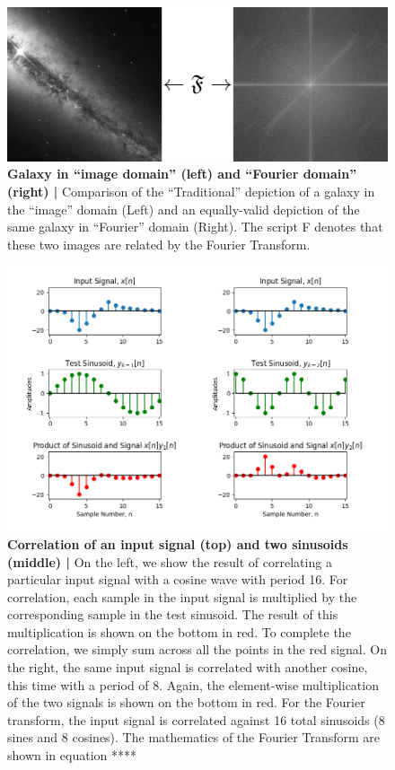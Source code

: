 \documentclass[12pt,a4paper]{article}
\author{Devin Cody}
\begin{document}
\begin{figure}
\centering
\includegraphics[width=\textwidth]{_images/FT.png}
\caption{\textbf{Galaxy in ``image domain'' (left) and ``Fourier domain'' (right) |} Comparison of the ``Traditional'' depiction of a galaxy in the ``image'' domain (Left) and an equally-valid depiction of the same galaxy in “Fourier” domain (Right). The script F denotes that these two images are related by the Fourier Transform.}
\end{figure}


\begin{figure}
\centering
\includegraphics[width=\textwidth]{_images/FourierCorrelation3-m56p3-47p1.png}
\caption{\textbf{Correlation of an input signal (top) and two sinusoids (middle) |} On the left, we show the result of correlating a particular input signal with a cosine wave with period 16. For correlation, each sample in the input signal is multiplied by the corresponding sample in the test sinusoid. The result of this multiplication is shown on the bottom in red. To complete the correlation, we simply sum across all the points in the red signal. On the right, the same input signal is correlated with another cosine, this time with a period of 8. Again, the element-wise multiplication of the two signals is shown on the bottom in red. For the Fourier transform, the input signal is correlated against 16 total sinusoids (8 sines and 8 cosines). The mathematics of the Fourier Transform are shown in equation ****}
\end{figure}
\end{document}
